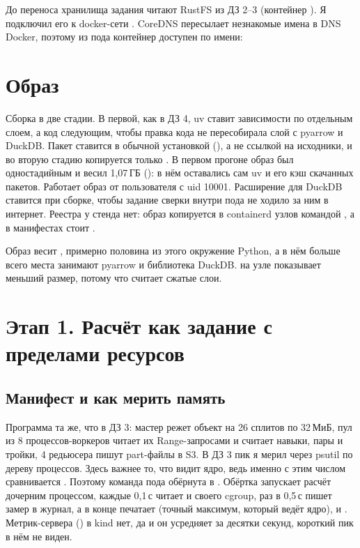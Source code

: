 До переноса хранилища задания читают RustFS из ДЗ 2--3 (контейнер ). Я подключил его к docker-сети . CoreDNS пересылает незнакомые имена в DNS Docker, поэтому из пода контейнер доступен по имени:


\section{Образ}\label{sec:image}


Сборка в две стадии. В первой, как в ДЗ 4, uv ставит зависимости по  отдельным слоем, а код следующим, чтобы правка кода не пересобирала слой с pyarrow и DuckDB. Пакет  ставится в  обычной установкой (), а не ссылкой на исходники, и во вторую стадию копируется только . В первом прогоне образ был одностадийным и весил 1,07\,ГБ (): в нём оставались сам uv и его кэш скачанных пакетов. Работает образ от пользователя с uid 10001. Расширение  для DuckDB ставится при сборке, чтобы задание сверки внутри пода не ходило за ним в интернет. Реестра у стенда нет: образ копируется в containerd узлов командой , а в манифестах стоит .


Образ весит \imageSize, примерно половина из этого окружение Python, а в нём больше всего места занимают pyarrow и библиотека DuckDB.  на узле показывает меньший размер, потому что считает сжатые слои.

\section{Этап 1. Расчёт как задание с пределами ресурсов}\label{sec:memory}

\subsection{Манифест и как мерить память}
Программа та же, что в ДЗ 3: мастер режет объект на 26 сплитов по 32\,МиБ, пул из 8 процессов-воркеров читает их Range-запросами и считает навыки, пары и тройки, 4 редьюсера пишут part-файлы в S3. В ДЗ 3 пик я мерил через psutil по дереву процессов. Здесь важнее то, что видит ядро, ведь именно с этим числом сравнивается . Поэтому команда пода обёрнута в . Обёртка запускает расчёт дочерним процессом, каждые 0,1\,с читает  и  своего cgroup, раз в 0,5\,с пишет замер в журнал, а в конце печатает  (точный максимум, который ведёт ядро),  и . Метрик-сервера () в kind нет, да и он усредняет за десятки секунд, короткий пик в нём не виден.

